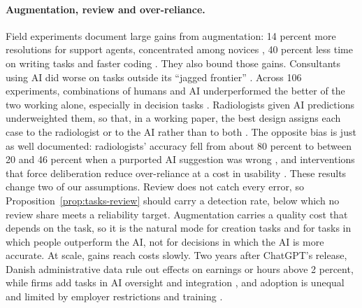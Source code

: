 \paragraph{Augmentation, review and over-reliance.} Field experiments document large gains from augmentation: 14 percent more resolutions for support agents, concentrated among novices \citep{brynjolfsson2025generative}, 40 percent less time on writing tasks \citep{noy2023experimental} and faster coding \citep{peng2023impact}. They also bound those gains. Consultants using AI did worse on tasks outside its ``jagged frontier'' \citep{dellacqua2026navigating}. Across 106 experiments, combinations of humans and AI underperformed the better of the two working alone, especially in decision tasks \citep{vaccaro2024when}. Radiologists given AI predictions underweighted them, so that, in a working paper, the best design assigns each case to the radiologist or to the AI rather than to both \citep{agarwal2023combining}. The opposite bias is just as well documented: radiologists' accuracy fell from about 80 percent to between 20 and 46 percent when a purported AI suggestion was wrong \citep{dratsch2023automation}, and interventions that force deliberation reduce over-reliance at a cost in usability \citep{bucinca2021trust}. These results change two of our assumptions. Review does not catch every error, so Proposition~\ref{prop:tasks-review} should carry a detection rate, below which no review share meets a reliability target. Augmentation carries a quality cost that depends on the task, so it is the natural mode for creation tasks and for tasks in which people outperform the AI, not for decisions in which the AI is more accurate. At scale, gains reach costs slowly. Two years after ChatGPT's release, Danish administrative data rule out effects on earnings or hours above 2 percent, while firms add tasks in AI oversight and integration \citep{humlum2025still}, and adoption is unequal and limited by employer restrictions and training \citep{humlum2025unequal}.

